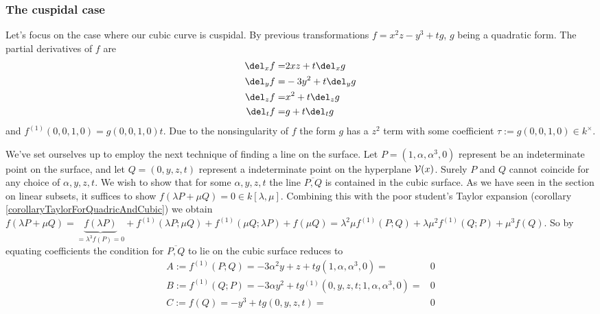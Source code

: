 \subsubsection{The cuspidal case}
Let's focus on the case where our cubic curve is cuspidal. By previous transformations $f = x^2z - y^3 + tg$, $g$ being a quadratic form.
The partial derivatives of $f$ are
\begin{align}
   \del_x f =& 2xz + t\del_x g
\\ \del_y f =& -3y^2 + t\del_y g
\\ \del_z f =& x^2 + t\del_z g
\\ \del_t f =& g + t\del_t g
\end{align}
and $f^{(1)}(0,0,1,0) = g(0,0,1,0)t$.
Due to the nonsingularity of $f$ the form $g$ has a $z^2$ term with some coefficient $\tau := g(0,0,1,0) \in k^\times$.

We've set ourselves up to employ the next technique of finding a line on the surface.
Let $P= (1,\alpha,\alpha^3,0)$ represent be an indeterminate point on the surface,
and let $Q = (0,y,z,t)$ represent a indeterminate point on the hyperplane $\operatorname{\mathcal V}(x)$.
Surely $P$ and $Q$ cannot coincide for any choice of $\alpha,y,z,t$.
We wish to show that for some $\alpha,y,z,t$ the line $\overline{P,Q}$ is contained in the cubic surface.
As we have seen in the section on linear subsets, it suffices to show $f(\lambda P + \mu Q) = 0 \in k[\lambda,\mu]$.
Combining this with the poor student's Taylor expansion (corollary \ref{corollaryTaylorForQuadricAndCubic}) we obtain
$f(\lambda P + \mu Q)
= \underset{=\lambda^3 f(P) = 0}{\underbrace{f(\lambda P)}}
+ f^{(1)}(\lambda P;\mu Q)
+ f^{(1)}(\mu Q;\lambda P)
+ f(\mu Q)
= \lambda^2\mu f^{(1)}(P;Q)
+ \lambda\mu^2 f^{(1)}(Q;P)
+ \mu^3 f(Q)$.
So by equating coefficients the condition for $\overline{P,Q}$ to lie on the cubic surface reduces to
\begin{align}
A :=  f^{(1)}(P;Q) = -3\alpha^2 y + z + tg(1,\alpha,\alpha^3,0) =& 0 \\
B :=  f^{(1)}(Q;P) = -3\alpha y^2 + tg^{(1)}(0,y,z,t;1,\alpha,\alpha^3,0) =& 0 \\
C :=  f(Q)         = -y^3 + tg(0,y,z,t) =& 0
\end{align}

